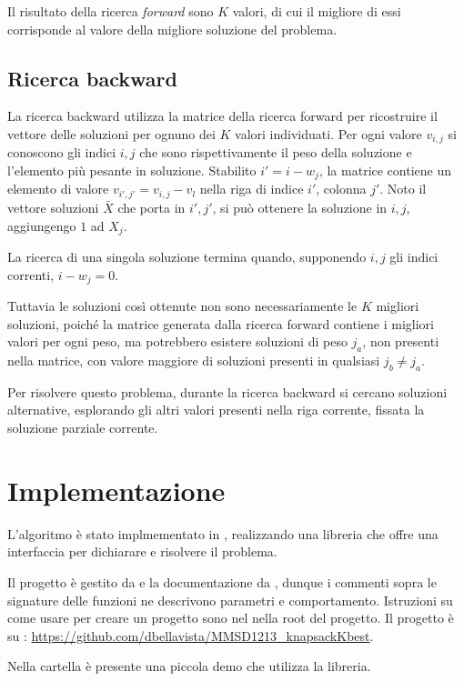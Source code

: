 Il risultato della ricerca \emph{forward} sono $K$ valori, di cui il migliore
di essi corrisponde al valore della migliore soluzione del problema.

\subsection{Ricerca backward}

La ricerca backward utilizza la matrice della ricerca forward per ricostruire
il vettore delle soluzioni per ognuno dei $K$ valori individuati. Per ogni
valore $v_{i,j}$ si conoscono gli indici $i,j$ che sono rispettivamente il peso
della soluzione e l'elemento più pesante in soluzione. Stabilito $i' = i -
w_j$, la matrice contiene un elemento di valore $v_{i',j'} = v_{i,j} - v_l$
nella riga di indice $i'$, colonna $j'$. Noto il vettore soluzioni $\bar{X}$
che porta in ${i',j'}$, si può ottenere la soluzione in ${i,j}$, aggiungengo
$1$ ad $X_j$.

La ricerca di una singola soluzione termina quando, supponendo $i,j$ gli indici
correnti, $i - w_j = 0$.

Tuttavia le soluzioni cos\`i ottenute non sono necessariamente le $K$ migliori
soluzioni, poich\'e la matrice generata dalla ricerca forward contiene i
migliori valori per ogni peso, ma potrebbero esistere soluzioni di peso $j_a$,
non presenti nella matrice, con valore maggiore di soluzioni presenti in
qualsiasi $j_b \neq j_a$.

Per risolvere questo problema, durante la ricerca backward si cercano soluzioni
alternative, esplorando gli altri valori presenti nella riga corrente, fissata
la soluzione parziale corrente.

\section{Implementazione}

L'algoritmo è stato implmementato in , realizzando una libreria che
offre una interfaccia per dichiarare e risolvere il problema.

Il progetto è gestito da  e la documentazione da ,
dunque i commenti sopra le signature delle funzioni ne descrivono parametri e
comportamento. Istruzioni su come usare  per creare un progetto
sono nel  nella root del progetto. Il progetto è su :
\url{https://github.com/dbellavista/MMSD1213_knapsackKbest}.

Nella cartella  è presente una piccola demo che utilizza la
libreria.

